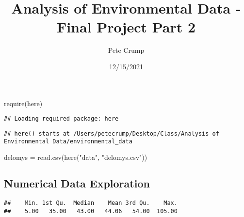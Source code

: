 \documentclass[
]{article}
\title{Analysis of Environmental Data - Final Project Part 2}
\author{Pete Crump}
\date{12/15/2021}
\newenvironment{Shaded}{\begin{snugshade}}{\end{snugshade}}
\newcommand{\CommentTok}[1]{\textcolor[rgb]{0.56,0.35,0.01}{\textit{#1}}}
\newcommand{\FunctionTok}[1]{\textcolor[rgb]{0.00,0.00,0.00}{#1}}
\newcommand{\NormalTok}[1]{#1}
\newcommand{\OtherTok}[1]{\textcolor[rgb]{0.56,0.35,0.01}{#1}}
\newcommand{\SpecialCharTok}[1]{\textcolor[rgb]{0.00,0.00,0.00}{#1}}
\newcommand{\StringTok}[1]{\textcolor[rgb]{0.31,0.60,0.02}{#1}}
\begin{document}
\maketitle

\begin{Shaded}
\begin{Highlighting}[]
\FunctionTok{require}\NormalTok{(here)}
\end{Highlighting}
\end{Shaded}

\begin{verbatim}
## Loading required package: here
\end{verbatim}

\begin{verbatim}
## here() starts at /Users/petecrump/Desktop/Class/Analysis of Environmental Data/environmental_data
\end{verbatim}

\begin{Shaded}
\begin{Highlighting}[]
\NormalTok{delomys }\OtherTok{=} \FunctionTok{read.csv}\NormalTok{(}\FunctionTok{here}\NormalTok{(}\StringTok{"data"}\NormalTok{, }\StringTok{"delomys.csv"}\NormalTok{))}
\end{Highlighting}
\end{Shaded}

\hypertarget{numerical-data-exploration}{%
\subsection{Numerical Data
Exploration}\label{numerical-data-exploration}}

\begin{Shaded}
\end{Shaded}

\begin{verbatim}
##    Min. 1st Qu.  Median    Mean 3rd Qu.    Max. 
##    5.00   35.00   43.00   44.06   54.00  105.00
\end{verbatim}

\begin{Shaded}
\end{Shaded}
\end{document}
